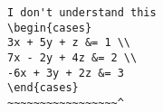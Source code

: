 \begin{verbatim}
I don't understand this
\begin{cases}
3x + 5y + z &= 1 \\
7x - 2y + 4z &= 2 \\
-6x + 3y + 2z &= 3
\end{cases}
~~~~~~~~~~~~~~~~~^
\end{verbatim}
